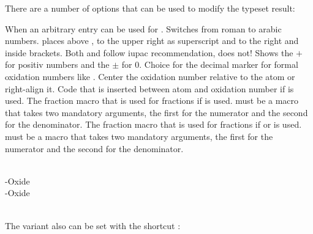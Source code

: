 \documentclass[load-preamble+]{cnltx-doc}
\begin{document}
There are a number of options that can be used to modify the typeset result:
\begin{options}
    When  an arbitrary entry can be used for .
    Switches from roman to arabic numbers.
     places  above ,  to the
    upper right as superscript and  to the right and inside
    brackets.  Both  and  follow \ac{iupac}
    recommendation,  does not!
    Shows the $+$ for positiv numbers and the $\pm$ for $0$.
    Choice for the decimal marker for formal oxidation numbers like .
    Center the oxidation number relative to the atom or right-align it.
  \Default{\cs*{,}}
    Code that is inserted between atom and oxidation number if
     is used.
    The fraction macro that is used for fractions if  is
    used.   must be a macro that takes two mandatory arguments, the
    first for the numerator and the second for the denominator.
    The fraction macro that is used for fractions if  or
     is used.   must be a macro that takes two
    mandatory arguments, the first for the numerator and the second for the
    denominator.
\end{options}

\begin{example}
    \\
  -Oxide \\
  -Oxide \\
   \\
\end{example}

The  variant also can be set with the shortcut \sarg:
\begin{example}
   
\end{example}
\end{document}
